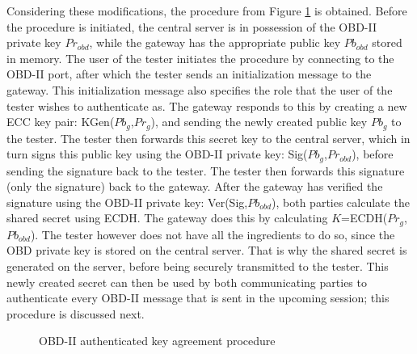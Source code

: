 Considering these modifications, the procedure from Figure \ref{fig:authentication_procedure} is obtained. Before the procedure is initiated, the central server is in possession of the OBD-II private key $Pr_{obd}$, while the gateway has the appropriate public key $Pb_{obd}$ stored in memory. The user of the tester initiates the procedure by connecting to the OBD-II port, after which the tester sends an initialization message to the gateway. This initialization message also specifies the role that the user of the tester wishes to authenticate as. The gateway responds to this by creating a new ECC key pair: KGen($Pb_g$,$Pr_g$), and sending the newly created public key $Pb_g$ to the tester. The tester then forwards this secret key to the central server, which in turn signs this public key using the OBD-II private key: Sig($Pb_g$,$Pr_{obd}$), before sending the signature back to the tester. The tester then forwards this signature (only the signature) back to the gateway. After the gateway has verified the signature using the OBD-II private key: Ver(Sig,$Pb_{obd}$), both parties calculate the shared secret using ECDH. The gateway does this by calculating $K$=ECDH($Pr_g$,$Pb_{obd}$). The tester however does not have all the ingredients to do so, since the OBD private key is stored on the central server. That is why the shared secret is generated on the server, before being securely transmitted to the tester. This newly created secret can then be used by both communicating parties to authenticate every OBD-II message that is sent in the upcoming session; this procedure is discussed next.
 
\begin{figure}[h]
	\centering
	\caption{OBD-II authenticated key agreement procedure}
	\label{fig:authentication_procedure}
\end{figure}

